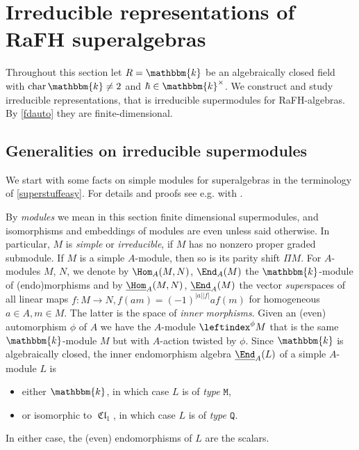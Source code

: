 \documentclass[a4paper,11pt]{amsart}
\newcommand{\uHom}{\underline{\Hom}}
\newcommand{\uEnd}{\underline{\End}}
\numberwithin{equation}{subsection}
\theoremstyle{definition}
\theoremstyle{theorem}
\theoremstyle{remark}
\DeclareMathOperator\Cl{\mathfrak{Cl}}
\newcommand\kk{\mathbbm{k}}
\begin{document}
\section{Irreducible representations of RaFH superalgebras}
Throughout this section let $R=\kk$ be an algebraically closed field with $\operatorname{char}{\kk}\not=2$ and $\hbar\in\kk^\times$. We construct and study irreducible representations, that is irreducible supermodules for RaFH-algebras.  By \autoref{fdauto}  they are finite-dimensional.

\subsection{Generalities on irreducible supermodules}\label{uEnd}We start with some facts on simple modules for superalgebras in the terminology of \autoref{superstuffeasy}. For details and proofs see e.g. \cite[\S12]{Kleshchevbook} with \cite{ChengWang, Jozefiak}.

By \emph{modules} we mean in this section finite dimensional supermodules, and isomorphisms and embeddings of modules are even unless said otherwise. In particular, $M$ is \emph{simple} or \emph{irreducible}, if $M$ has no nonzero proper graded
submodule. If $M$ is a simple $A$-module, then so is its parity shift $\Pi M$.
For $A$-modules $M$, $N$, we denote by $\Hom_A(M,N)$, $\End_A(M)$ the $\kk$-module of (endo)morphisms and by $\uHom_A(M,N)$, $\uEnd_A(M)$ the vector \emph{super}spaces of all linear maps $f\colon M\rightarrow N,f(am)=(-1)^{|a||f|}af(m)$ for homogeneous $a\in A, m\in M$. The latter is the  space of \emph{inner morphisms}.
Given an (even) automorphism  $\phi$ of $A$ we have the $A$-module $\leftindex^{\phi}M$
that is the same $\kk$-module $M$ but  with $A$-action twisted by $\phi$.
Since  $\kk$ is algebraically closed, the inner endomorphism algebra  $\uEnd_A(L)$ of a simple $A$-module $L$ is
\begin{itemize}
\item  either $\kk$, in which case $L$ is of \emph{type $\mathtt M$},
\item or isomorphic to $\Cl_1$, in which case $L$ is of \emph{type $\mathtt Q$}.
\end{itemize}
In either case, the (even) endomorphisms of $L$ are the scalars.
\end{document}
